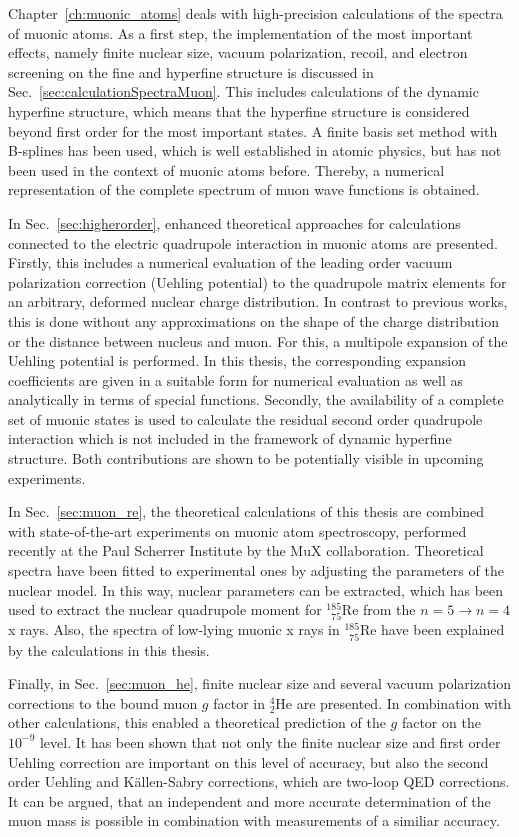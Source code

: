 Chapter~\ref{ch:muonic_atoms} deals with high-precision calculations of the spectra of muonic atoms. 
As a first step, the implementation of the most important effects, namely finite nuclear size, vacuum polarization, recoil, and electron screening on the fine and hyperfine structure is discussed in Sec.~\ref{sec:calculationSpectraMuon}.
This includes calculations of the dynamic hyperfine structure, which means that the hyperfine structure is considered beyond first order for the most important states.
A finite basis set method with B-splines has been used, which is well established in atomic physics, but has not been used in the context of muonic atoms before. Thereby, a numerical representation of the complete spectrum of muon wave functions is obtained.

In Sec.~\ref{sec:higherorder}, enhanced theoretical approaches for calculations connected to the electric quadrupole interaction in muonic atoms are presented. 
Firstly, this includes a numerical evaluation of the leading order vacuum polarization correction (Uehling potential) to the quadrupole matrix elements for an arbitrary, deformed nuclear charge distribution. In contrast to previous works, this is done without any approximations on the shape of the charge distribution or the distance between nucleus and muon. For this, a multipole expansion of the Uehling potential is performed. In this thesis, the corresponding expansion coefficients are given in a suitable form for numerical evaluation as well as analytically in terms of special functions.
Secondly, the availability of a complete set of muonic states is used to calculate the residual second order quadrupole interaction which is not included in the framework of dynamic hyperfine structure. 
Both contributions are shown to be potentially visible in upcoming experiments.

In Sec.~\ref{sec:muon_re}, the theoretical calculations of this thesis are combined with state-of-the-art experiments on muonic atom spectroscopy, performed recently at the Paul Scherrer Institute by the MuX collaboration. Theoretical spectra have been fitted to experimental ones by adjusting the parameters of the nuclear model. In this way, nuclear parameters can be extracted, which has been used to extract the nuclear quadrupole moment for $_{\phantom{1}75}^{185}$Re from the ${n}{=}{5}\rightarrow {n}{=}{4}$ x rays. Also, the spectra of low-lying muonic x rays in $_{\phantom{1}75}^{185}$Re have been explained by the calculations in this thesis.

Finally, in Sec.~\ref{sec:muon_he}, finite nuclear size and several vacuum polarization corrections to the bound muon $g$ factor in $_2^4$He are presented. In combination with other calculations, this enabled a theoretical prediction of the $g$ factor on the $10^{-9}$ level. It has been shown that not only the finite nuclear size and first order Uehling correction are important on this level of accuracy, but also the second order Uehling and Källen-Sabry corrections, which are two-loop QED corrections.
It can be argued, that an independent and more accurate determination of the muon mass is possible in combination with measurements of a similiar accuracy.\\[0.3cm]

